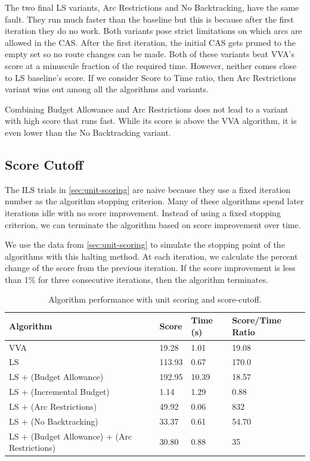 \documentclass[honors]{union-cs-thesis}
\begin{document}
The two final LS variants, Arc Restrictions and No Backtracking, have the same fault. They run much faster than the baseline but this is because after the first iteration they do no work. Both variants pose strict limitations on which arcs are allowed in the CAS. After the first iteration, the initial CAS gets pruned to the empty set so no route changes can be made. Both of these variants beat VVA's score at a minuscule fraction of the required time. However, neither comes close to LS baseline's score. If we consider Score to Time ratio, then Arc Restrictions variant wins out among all the algorithms and variants.

Combining Budget Allowance and Arc Restrictions does not lead to a variant with high score that runs fast. While its score is above the VVA algorithm, it is even lower than the No Backtracking variant.


\subsection{Score Cutoff}
\label{sec:score-cutoff}
The ILS trials in \cref{sec:unit-scoring} are naive because they use a fixed iteration number as the algorithm stopping criterion. Many of these algorithms spend later iterations idle with no score improvement. Instead of using a fixed stopping criterion, we can terminate the algorithm based on score improvement over time. 

We use the data from \cref{sec:unit-scoring} to simulate the stopping point of the algorithms with this halting method. At each iteration, we calculate the percent change of the score from the previous iteration. If the score improvement is less than 1\% for three consecutive iterations, then the algorithm terminates.    

\begin{table}
\begin{center}
\begin{tabular}{|l|l|l|l|}
    \hline
    \textbf{Algorithm} & \textbf{Score} & \textbf{Time (s)} & \textbf{Score/Time Ratio} \\
    \hline
    VVA & 19.28 & 1.01 & 19.08 \\
    \hline
    LS & 113.93 & 0.67 & 170.0 \\
    \hline
    LS + (Budget Allowance) & 192.95 & 10.39 & 18.57 \\
    \hline
    LS + (Incremental Budget) & 1.14 & 1.29 & 0.88 \\
    \hline
    LS + (Arc Restrictions) & 49.92 & 0.06 & 832 \\
    \hline
    LS + (No Backtracking) & 33.37 & 0.61 & 54.70 \\
    \hline
    LS + (Budget Allowance) + (Arc Restrictions) & 30.80 & 0.88 & 35  \\
    \hline
\end{tabular}
\caption{Algorithm performance with unit scoring and score-cutoff.}
\label{tab:score-cuttoff-results}
\end{center}
\end{table}
\end{document}
